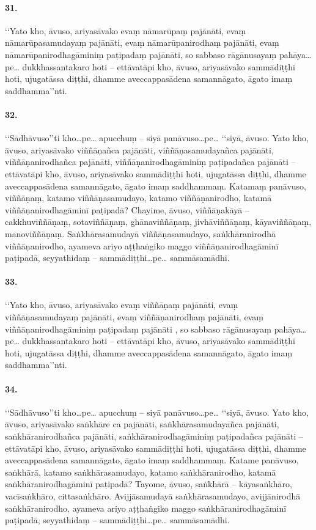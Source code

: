 \paragraph{31.} ‘‘Yato kho, āvuso, ariyasāvako evaṃ nāmarūpaṃ pajānāti, evaṃ nāmarūpasamudayaṃ pajānāti, evaṃ nāmarūpanirodhaṃ pajānāti, evaṃ nāmarūpanirodhagāminiṃ paṭipadaṃ pajānāti, so sabbaso rāgānusayaṃ pahāya…pe… dukkhassantakaro hoti – ettāvatāpi kho, āvuso, ariyasāvako sammādiṭṭhi hoti, ujugatāssa diṭṭhi, dhamme aveccappasādena samannāgato, āgato imaṃ saddhamma’’nti.

\paragraph{32.} ‘‘Sādhāvuso’’ti kho…pe… apucchuṃ – siyā panāvuso…pe… ‘‘siyā, āvuso. Yato kho, āvuso, ariyasāvako viññāṇañca pajānāti, viññāṇasamudayañca pajānāti, viññāṇanirodhañca pajānāti, viññāṇanirodhagāminiṃ paṭipadañca pajānāti – ettāvatāpi kho, āvuso, ariyasāvako sammādiṭṭhi hoti, ujugatāssa diṭṭhi, dhamme aveccappasādena samannāgato, āgato imaṃ saddhammaṃ. Katamaṃ panāvuso, viññāṇaṃ, katamo viññāṇasamudayo, katamo viññāṇanirodho, katamā viññāṇanirodhagāminī paṭipadā? Chayime, āvuso, viññāṇakāyā – cakkhuviññāṇaṃ, sotaviññāṇaṃ, ghānaviññāṇaṃ, jivhāviññāṇaṃ, kāyaviññāṇaṃ, manoviññāṇaṃ. Saṅkhārasamudayā viññāṇasamudayo, saṅkhāranirodhā viññāṇanirodho, ayameva ariyo aṭṭhaṅgiko maggo viññāṇanirodhagāminī paṭipadā, seyyathidaṃ – sammādiṭṭhi…pe… sammāsamādhi.

\paragraph{33.} ‘‘Yato kho, āvuso, ariyasāvako evaṃ viññāṇaṃ pajānāti, evaṃ viññāṇasamudayaṃ pajānāti, evaṃ viññāṇanirodhaṃ pajānāti, evaṃ viññāṇanirodhagāminiṃ paṭipadaṃ pajānāti , so sabbaso rāgānusayaṃ pahāya…pe… dukkhassantakaro hoti – ettāvatāpi kho, āvuso, ariyasāvako sammādiṭṭhi hoti, ujugatāssa diṭṭhi, dhamme aveccappasādena samannāgato, āgato imaṃ saddhamma’’nti.

\paragraph{34.} ‘‘Sādhāvuso’’ti kho…pe… apucchuṃ – siyā panāvuso…pe… ‘‘siyā, āvuso. Yato kho, āvuso, ariyasāvako saṅkhāre ca pajānāti, saṅkhārasamudayañca pajānāti, saṅkhāranirodhañca pajānāti, saṅkhāranirodhagāminiṃ paṭipadañca pajānāti – ettāvatāpi kho, āvuso, ariyasāvako sammādiṭṭhi hoti, ujugatāssa diṭṭhi, dhamme aveccappasādena samannāgato, āgato imaṃ saddhammaṃ. Katame panāvuso, saṅkhārā, katamo saṅkhārasamudayo, katamo saṅkhāranirodho, katamā saṅkhāranirodhagāminī paṭipadā? Tayome, āvuso, saṅkhārā – kāyasaṅkhāro, vacīsaṅkhāro, cittasaṅkhāro. Avijjāsamudayā saṅkhārasamudayo, avijjānirodhā saṅkhāranirodho, ayameva ariyo aṭṭhaṅgiko maggo saṅkhāranirodhagāminī paṭipadā, seyyathidaṃ – sammādiṭṭhi…pe… sammāsamādhi.

